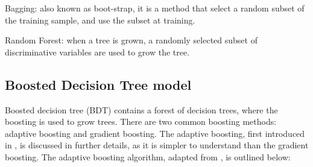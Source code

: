 
Bagging: also known as boot-strap, it is a method that select a  random subset of the training sample, and use the subset at training.


Random Forest: when a tree is grown, a randomly selected subset of discriminative variables are used to grow the tree. %

\subsection{Boosted Decision Tree model}
\label{sec:analysisBDT}

Boosted decision tree (BDT) contains a forest of decision trees, where the boosting is used to grow trees. There are two common boosting methods: adaptive boosting and gradient boosting. The adaptive boosting,  first introduced in \cite{FREUND1997119}, is discussed in further details, as it is simpler to understand than the gradient boosting. The adaptive boosting algorithm, adapted from \cite{hastie2009elements},  is outlined below:

